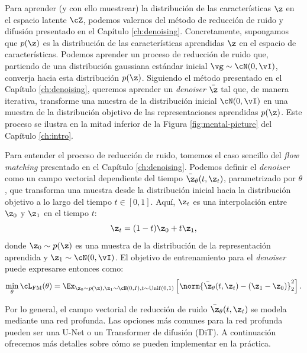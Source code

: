 \documentclass[../../book-main_es.tex]{subfiles}
\begin{document}
Para aprender (y con ello muestrear) la distribución de las características $\z$ en el espacio 
latente $\cZ$, podemos valernos del método de reducción de ruido y difusión presentado en el 
Capítulo \ref{ch:denoising}. Concretamente, supongamos que $p(\z)$ es la distribución de las 
características aprendidas $\z$ en el espacio de características. Podemos aprender un proceso 
de reducción de ruido que, partiendo de una distribución gaussiana estándar inicial $\vg \sim \cN(0, \vI)$, 
converja hacia esta distribución $p(\z)$. Siguiendo el método presentado en el Capítulo \ref{ch:denoising}, 
queremos aprender un \textit{denoiser} $\bar{\z}$ tal que, de manera iterativa, transforme una muestra de la 
distribución inicial $\cN(0, \vI)$ en una muestra de la distribución objetivo de las representaciones 
aprendidas $p(\z)$. Este proceso se ilustra en la mitad inferior de la Figura \ref{fig:mental-picture} 
del Capítulo \ref{ch:intro}.

Para entender el proceso de reducción de ruido, tomemos el caso sencillo del \textit{flow matching}
presentado en el Capítulo \ref{ch:denoising}. Podemos definir el \textit{denoiser} como un campo vectorial 
dependiente del tiempo $\bar{\z}_{\theta}(t, \z_t)$, parametrizado por $\theta$, que transforma una muestra desde la
distribución inicial hacia la distribución objetivo a lo largo del tiempo $t \in [0, 1]$. 
Aquí, $\z_t$ es una interpolación entre $\z_0$ y $\z_1$ en el tiempo $t$:
\begin{equation}
\z_t = (1 - t)\z_0 + t\z_1,
\end{equation}
donde $\z_0 \sim p(\z)$ es una muestra de la distribución de la representación aprendida
y $\z_1 \sim \cN(0, \vI)$.
El objetivo de entrenamiento para el \textit{denoiser} puede expresarse entonces como:
\begin{equation}
\min_{\theta} \cL_{\mathrm{FM}}(\theta) = \Ex_{\z_0 \sim p(\z), \z_1
\sim \cN(0, I), t \sim \mathrm{Unif}(0, 1)} \left[
\norm{\bar{\z}_{\theta}(t,\z_t) - (\z_1 - \z_0)}_2^2 \right].
\end{equation}

Por lo general, el campo vectorial de reducción de ruido $\bar{\z}_{\theta}(t, \z_t)$ 
se modela mediante una red profunda. Las opciones más comunes para la red profunda pueden ser 
una U-Net o un Transformer de difusión (DiT). A continuación ofrecemos 
más detalles sobre cómo se pueden implementar en la práctica.
\end{document}
